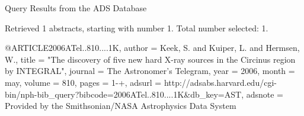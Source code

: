 Query Results from the ADS Database


Retrieved 1 abstracts, starting with number 1.  Total number selected: 1.

@ARTICLE{2006ATel..810....1K,
   author = {{Keek}, S. and {Kuiper}, L. and {Hermsen}, W.},
    title = "{The discovery of five new hard X-ray sources in the Circinus region by INTEGRAL}",
  journal = {The Astronomer's Telegram},
     year = 2006,
    month = may,
   volume = 810,
    pages = {1-+},
   adsurl = {http://adsabs.harvard.edu/cgi-bin/nph-bib_query?bibcode=2006ATel..810....1K&db_key=AST},
  adsnote = {Provided by the Smithsonian/NASA Astrophysics Data System}
}



